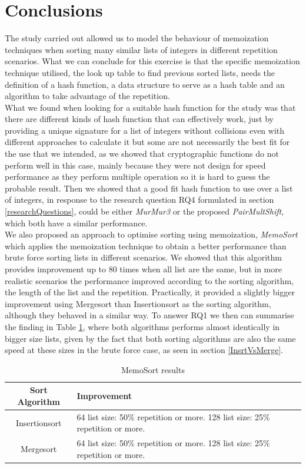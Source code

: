 \documentclass[a4paper,12pt]{article}
\begin{document}
\section{Conclusions}
The study carried out  allowed us to model the behaviour of memoization techniques when sorting many similar lists of integers in different repetition scenarios. What we can conclude for this exercise is that the specific memoization technique utilised, the look  up table to find previous sorted lists, needs the definition of a hash function, a data structure to serve as a hash table and an algorithm to take advantage of the repetition.\\

What we found when looking for a suitable hash function for the study was that there are different kinds of hash function that can effectively work, just by providing a unique signature for a list of integers without collisions even with different approaches to calculate it but some are not necessarily the best fit for the use that we intended, as we showed that cryptographic functions do not perform well in this case, mainly because they were not design for speed performance as they perform multiple operation so it is hard to guess the probable result. Then we showed that a good fit hash function to use over a list of integers, in response to the research question RQ4 formulated in section \ref{researchQuestions}, could be either  {\it MurMur3}  or the proposed  {\it PairMultShift}, which both have a similar performance.\\

We also proposed an approach to optimise sorting using memoization, {\it MemoSort} which applies the memoization technique to obtain a better performance than brute force sorting lists in different scenarios. We showed that this algorithm provides improvement up to 80 times when all list are the same, but in more realistic scenarios the performance improved according to the sorting algorithm, the length of the list and the repetition. Practically, it provided a slightly bigger improvement using Mergesort than Insertionsort as the sorting algorithm, although they behaved in a similar way. To answer RQ1 we then can summarise the finding in Table \ref{fig:MemoSortResults}, where both algorithms performs almost identically in bigger size lists, given by the fact that both sorting algorithms are also the same speed at these sizes in the brute force case, as seen in section \ref{InsrtVsMerge}.

\begin{table}[H]
\centering
\begin{tabular}{|c|p{70mm}|}   \hline
	{Sort Algorithm} & {Improvement} \\  \hline
	Insertionsort & 64 list size: 50\% repetition or more. 128 list size: 25\% repetition or more.\\ 
	Mergesort & 64 list size: 50\% repetition or more. 128 list size: 25\% repetition or more. \\  \hline
\end{tabular}
\caption{MemoSort results}
\label{fig:MemoSortResults}
\end{table}
\end{document}
